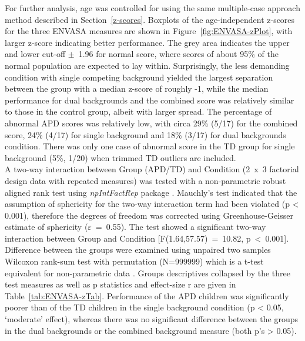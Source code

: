 \documentclass[a4paper, twoside]{templates/ociamthesis}
\begin{document}
For further analysis, age was controlled for using the same multiple-case approach method described in Section~\ref{z-scores}. Boxplots of the age-independent z-scores for the three ENVASA measures are shown in Figure~\ref{fig:ENVASA-zPlot}, with larger z-score indicating better performance. The grey area indicates the upper and lower cut-off \(\pm\)~1.96 for normal score, where scores of about 95\% of the normal population are expected to lay within. Surprisingly, the less demanding condition with single competing background yielded the largest separation between the group with a median z-score of roughly -1, while the median performance for dual backgrounds and the combined score was relatively similar to those in the control group, albeit with larger spread. The percentage of abnormal APD scores was relatively low, with circa 29\% (5/17) for the combined score, 24\% (4/17) for single background and 18\% (3/17) for dual backgrounds condition. There was only one case of abnormal score in the TD group for single background (5\%, 1/20) when trimmed TD outliers are included.\\

A two-way interaction between Group (APD/TD) and Condition (2~x~3 factorial design data with repeated measures) was tested with a non-parametric robust aligned rank test using \emph{npIntFactRep} package \autocite{npIntFactRepPackageR}. Mauchly's test indicated that the assumption of sphericity for the two-way interaction term had been violated (p \textless{} 0.001), therefore the degrees of freedom was corrected using Greenhouse-Geisser estimate of sphericity (\(\varepsilon\)~=~0.55). The test showed a significant two-way interaction between Group and Condition {[}F(1.64,57.57)~=~10.82, p~\textless~0.001{]}. Difference between the groups were examined using unpaired two samples Wilcoxon rank-sum test with permutation (N=999999) which is a t-test equivalent for non-parametric data \autocite[\emph{coin::wilcox\_test()};][]{CoinPackageR}. Groups descriptives collapsed by the three test measures as well as p statistics and effect-size r are given in Table~\ref{tab:ENVASA-zTab}. Performance of the APD children was significantly poorer than of the TD children in the single background condition (p \textless{} 0.05, `moderate' effect), whereas there was no significant difference between the groups in the dual backgrounds or the combined background measure (both p's \textgreater{} 0.05).\\
\end{document}
